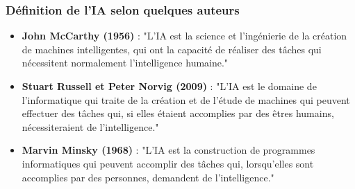 \documentclass{beamer}
\begin{document}
{
\begin{frame}
	\frametitle{Définition de l'IA selon quelques auteurs}
	\begin{itemize}
\color{white}		\item \textbf{John McCarthy (1956)} : "L'IA est la science et l'ingénierie de la création de machines intelligentes, qui ont la capacité de réaliser des tâches qui nécessitent normalement l'intelligence humaine."
\vspace{0.3cm}
		\item \textbf{Stuart Russell et Peter Norvig (2009)} : "L'IA est le domaine de l'informatique qui traite de la création et de l'étude de machines qui peuvent effectuer des tâches qui, si elles étaient accomplies par des êtres humains, nécessiteraient de l'intelligence."
		\vspace{0.3cm}
		\item \textbf{Marvin Minsky (1968)} : "L'IA est la construction de programmes informatiques qui peuvent accomplir des tâches qui, lorsqu'elles sont accomplies par des personnes, demandent de l'intelligence."
	\end{itemize}
	
\end{frame}
}	%



\end{document}
